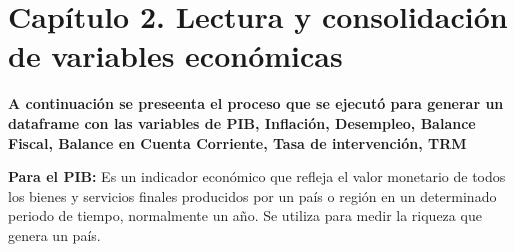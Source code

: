 \documentclass[
  11pt,
]{book}
\newenvironment{Shaded}{\begin{snugshade}}{\end{snugshade}}
\newcommand{\CommentTok}[1]{\textcolor[rgb]{0.56,0.35,0.01}{\textit{#1}}}
\newcommand{\DataTypeTok}[1]{\textcolor[rgb]{0.13,0.29,0.53}{#1}}
\newcommand{\DecValTok}[1]{\textcolor[rgb]{0.00,0.00,0.81}{#1}}
\newcommand{\KeywordTok}[1]{\textcolor[rgb]{0.13,0.29,0.53}{\textbf{#1}}}
\newcommand{\NormalTok}[1]{#1}
\newcommand{\OperatorTok}[1]{\textcolor[rgb]{0.81,0.36,0.00}{\textbf{#1}}}
\newcommand{\StringTok}[1]{\textcolor[rgb]{0.31,0.60,0.02}{#1}}
\begin{document}
\begin{Shaded}
\end{Shaded}

\hypertarget{capuxedtulo-2.-lectura-y-consolidaciuxf3n-de-variables-econuxf3micas}{%
\chapter{Capítulo 2. Lectura y consolidación de variables
económicas}\label{capuxedtulo-2.-lectura-y-consolidaciuxf3n-de-variables-econuxf3micas}}

\textbf{A continuación se preseenta el proceso que se ejecutó para generar un dataframe con las variables de PIB, Inflación, Desempleo, Balance Fiscal, Balance en Cuenta Corriente, Tasa de intervención, TRM}

\textbf{Para el PIB:} Es un indicador económico que refleja el valor
monetario de todos los bienes y servicios finales producidos por un país
o región en un determinado periodo de tiempo, normalmente un año. Se
utiliza para medir la riqueza que genera un país.
\end{document}
